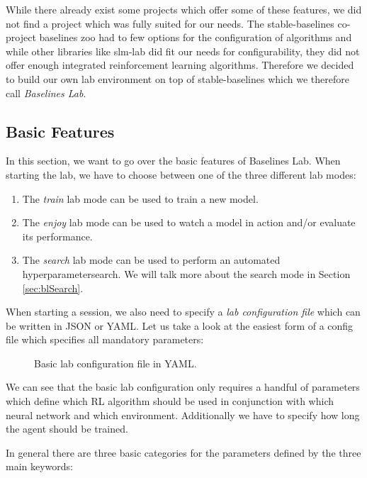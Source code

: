 While there already exist some projects which offer some of these features, we did not find a project which was fully suited for our needs. The stable-baselines co-project baselines zoo \cite{rl-zoo} had to few options for the configuration of algorithms and while other libraries like slm-lab \cite{kenggraesser2017slmlab} did fit our needs for configurability, they did not offer enough integrated reinforcement learning algorithms. Therefore we decided to build our own lab environment on top of stable-baselines which we therefore call \textit{Baselines Lab}.

\subsection{Basic Features} \label{sec:blFunctions}
In this section, we want to go over the basic features of Baselines Lab. When starting the lab, we have to choose between one of the three different lab modes:

\begin{enumerate}
    \item The \textit{train} lab mode can be used to train a new model.
    \item The \textit{enjoy} lab mode can be used to watch a model in action and/or evaluate its performance.
    \item The \textit{search} lab mode can be used to perform an automated hyperparametersearch. We will talk more about the search mode in Section \ref{sec:blSearch}.
\end{enumerate}

When starting a session, we also need to specify a \textit{lab configuration file} which can be written in JSON or YAML. Let us take a look at the easiest form of a config file which specifies all mandatory parameters:

\begin{figure}[h]
    
    \caption[Basic lab configuration file]{Basic lab configuration file in YAML.}
    \label{fig:BasicLabConfig}
\end{figure}


We can see that the basic lab configuration only requires a handful of parameters which define which RL algorithm should be used in conjunction with which neural network and which environment. Additionally we have to specify how long the agent should be trained. 

In general there are three basic categories for the parameters defined by the three main keywords: 

